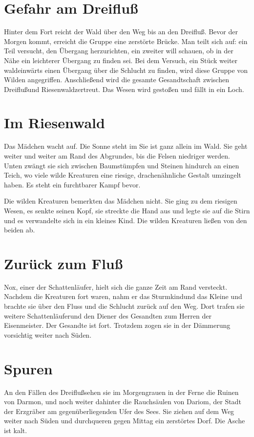 \documentclass[12pt,a4paper,onecolumn,twoside,ngerman]{book}
\newcommand{\Sturmkind}{Sturmkind}
\newcommand{\Schattenjager}{Schattenläufer}
\newcommand{\Nox}{Nox}
\newcommand{\Dreifluss}{Dreifluß}
\newcommand{\Darmon}{Darmon}
\newcommand{\Riesenwald}{Riesenwald}
\newcommand{\Eisenmeister}{Eisenmeister}
\newcommand{\Dariom}{Dariom}
\begin{document}
\section{Gefahr am \Dreifluss}
Hinter dem Fort reicht der Wald über den Weg bis an den \Dreifluss. Bevor der Morgen kommt, erreicht die Gruppe eine zerstörte Brücke. Man teilt sich auf: ein Teil versucht, den Übergang herzurichten, ein zweiter will schauen, ob in der Nähe ein leichterer Übergang zu finden sei. Bei dem Versuch, ein Stück weiter waldeinwärts einen Übergang über die Schlucht zu finden, wird diese Gruppe von Wilden angegriffen. Anschließend wird die gesamte Gesandtschaft zwischen \Dreifluss und \Riesenwald zertreut. Das Wesen wird gestoßen und fällt in ein Loch.

\section{Im \Riesenwald}
Das Mädchen wacht auf. Die Sonne steht im Sie ist ganz allein im Wald. Sie geht weiter und weiter am Rand des Abgrundes, bis die Felsen niedriger werden. Unten zwängt sie sich zwischen Baumstümpfen und Steinen hindurch an einen Teich, wo viele wilde Kreaturen eine riesige, drachenähnliche Gestalt umzingelt haben. Es steht ein furchtbarer Kampf bevor.

Die wilden Kreaturen bemerkten das Mädchen nicht. Sie ging zu dem riesigen Wesen, es senkte seinen Kopf, sie streckte die Hand aus und legte sie auf die Stirn und es verwandelte sich in ein kleines Kind. Die wilden Kreaturen ließen von den beiden ab.

\section{Zurück zum Fluß}
\Nox, einer der \Schattenjager, hielt sich die ganze Zeit am Rand versteckt. Nachdem die Kreaturen fort waren, nahm er das \Sturmkind und das Kleine und brachte sie über den Fluss und die Schlucht zurück auf den Weg. Dort trafen sie weitere \Schattenjager und den Diener des Gesandten zum Herren der \Eisenmeister. Der Gesandte ist fort. Trotzdem zogen sie in der Dämmerung vorsichtig weiter nach Süden.

\section{Spuren}
An den Fällen des \Dreifluss sehen sie im Morgengrauen in der Ferne die Ruinen von \Darmon, und noch weiter dahinter die Rauchsäulen von \Dariom, der Stadt der Erzgräber am gegenüberliegenden Ufer des Sees. Sie ziehen auf dem Weg weiter nach Süden und durchqueren gegen Mittag ein zerstörtes Dorf. Die Asche ist kalt.
\end{document}
